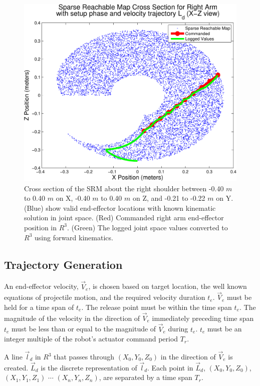 \begin{figure}[thpb]
  \centering
\includegraphics[width=1.0\columnwidth]{./MATLAB/throwTrajAct.pdf}
\caption{Cross section of the SRM about the right shoulder between -0.40 $m$ to 0.40 $m$ on X, -0.40 $m$ to 0.40 $m$ on Z, and -0.21 to -0.22 $m$ on Y.  (Blue) show valid end-effector locations with known kinematic solution in joint space. (Red) Commanded right arm end-effector position in $R^3$.  (Green) The logged joint space values converted to $R^3$ using forward kinematics.
}  \label{fig:sparseRegion}
\end{figure}



\subsection{Trajectory Generation}\label{sec:trajGen}
An end-effector velocity, $\vec{V}_e$, is chosen based on target location, the well known equations of projectile motion, and the required velocity duration $t_e$.  $\vec{V}_e$ must be held for a time span of $t_e$. The release point must be within the time span $t_e$.  The magnitude of the velocity in the direction of $\vec{V}_e$ immediately preceding time span $t_e$ must be less than or equal to the magnitude of $\vec{V}_e$ during $t_e$.  $t_e$ must be an integer multiple of the robot's actuator command period $T_r$.

A line $\vec{l}_d$ in $R^3$ that passes through $(X_0, Y_0, Z_0)$ in the direction of $\vec{V}_e$ is created.  $\vec{L}_d$ is the discrete representation of $\vec{l}_d$.  Each point in $\vec{L}_d$, $(X_0, Y_0, Z_0)$, $(X_1, Y_1, Z_1)$ $\cdots$ $(X_n, Y_n, Z_n)$, are separated by a time span $T_r$.

